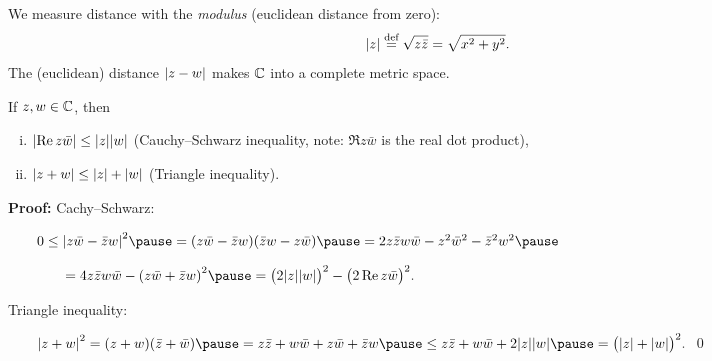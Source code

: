 \documentclass[10pt,aspectratio=169]{beamer}
\begin{document}
\begin{frame}
We measure distance with the \emph{modulus} (euclidean distance from zero):
\[
\lvert {z} \rvert \overset{\text{def}}{=} \sqrt{z \bar{z}} = \sqrt{x^2+y^2} .
\]
\pause
The (euclidean) distance 
\(
\lvert {z-w} \rvert
\)
makes ${\mathbb{C}}$ into a complete metric space.

\medskip
\pause

%
%
%
%
\begin{proposition}
If $z,w \in {\mathbb{C}}$, then
\begin{enumerate}[(i)]
\item
$\lvert {\operatorname{Re}z\bar{w}} \rvert \leq \lvert {z} \rvert \lvert {w} \rvert$ \quad (Cauchy--Schwarz inequality, note: $\Re z
\bar{w}$ is the real dot product),
\item
$\lvert {z+w} \rvert \leq \lvert {z} \rvert + \lvert {w} \rvert$ \quad (Triangle inequality).%
\end{enumerate}
\end{proposition}

\textbf{Proof:}
Cachy--Schwarz:

\medskip

\(
\qquad
0  \leq {\sabs{z\bar{w}-\bar{z}w}}^2 \pause
   =    (z\bar{w}-\bar{z}w)(\bar{z}w-z\bar{w})  \pause
   =    2z\bar{z}w\bar{w} - z^2\bar{w}^2 - \bar{z}^2w^2 \pause
\)

\( \qquad \qquad
   =    4z\bar{z}w\bar{w} - {(z\bar{w}+\bar{z}w)}^2 \pause
   =    {\bigl(2\sabs{z}\sabs{w}\bigr)}^2 - {\bigl(2 \Re z\bar{w}\bigr)}^2 .
\)

\medskip
\pause

Triangle inequality:

\medskip
\(
\qquad
{\sabs{z+w}}^2  =    (z+w)(\bar{z}+\bar{w}) \pause
                =    z\bar{z} + w\bar{w} + z\bar{w} + \bar{z}w \pause
                \leq z\bar{z} + w\bar{w} + 2 \sabs{z}\sabs{w} \pause
                =    {\bigl(\sabs{z}+\sabs{w}\bigr)}^2 .
\) \qed

\end{frame}
\end{document}
